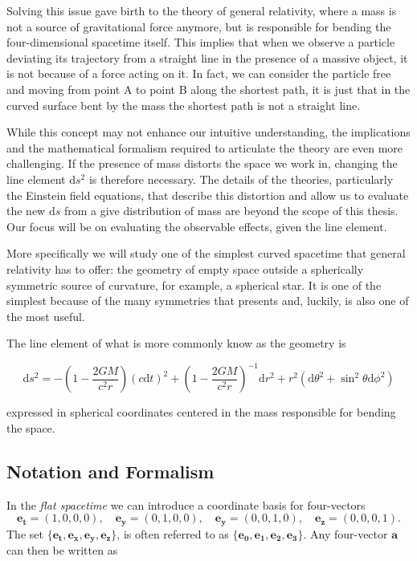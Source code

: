 Solving this issue gave birth to the theory of general relativity, where a mass
is not a source of gravitational force anymore, but is responsible for
bending the four-dimensional spacetime itself.
This implies that when we observe a particle deviating its trajectory from a
straight line in the presence of a massive object, it is not because of a force
acting on it.
In fact, we can consider the particle free and moving from point A to point B
along the shortest path, it is just that in the curved surface bent by the mass
the shortest path is not a straight line.

While this concept may not enhance our intuitive understanding, the
implications and the mathematical formalism required to articulate the theory
are even more challenging.
If the presence of mass distorts the space we work in, changing the line
element $\mathrm{d}s^2$ is therefore necessary.
The details of the theories, particularly the Einstein field equations, that
describe this distortion and allow us to evaluate the new $\mathrm{d}s$ from a
give distribution of mass are beyond the scope of this thesis.
Our focus will be on evaluating the observable effects, given the line
element.

More specifically we will study one of the simplest curved spacetime that
general relativity has to offer: the geometry of empty space outside a
spherically symmetric source of curvature, for example, a spherical
star.
It is one of the simplest because of the many symmetries that presents and,
luckily, is also one of the most useful.

The line element of what is more commonly know as the \Sh geometry is

\begin{equation*}
    \mathrm{d}s^2 = - \left(1 - \frac{2 G M}{c^2 r} \right) (c \mathrm{d}t)^2
    + \left(1 - \frac{2 G M}{c^2 r} \right)^{-1} \mathrm{d}r^2
    + r^2 (\mathrm{d}\theta^2 + \sin^2 \theta \mathrm{d}\phi^2)
\end{equation*}

expressed in spherical coordinates centered in the mass responsible for bending
the space.

\newpage


\subsection{Notation and Formalism} \label{cap1:ssec:notation}

In the \textit{flat spacetime} we can introduce a coordinate basis for
four-vectors
\begin{equation}
    \mathbf{e_t} = (1,0,0,0), \quad
    \mathbf{e_y} = (0,1,0,0), \quad
    \mathbf{e_y} = (0,0,1,0), \quad
    \mathbf{e_z} = (0,0,0,1).
    \label{cap1:eq:coord_base}
\end{equation}
The set 
$\{ \mathbf{e_t}, \mathbf{e_x}, \mathbf{e_y}, \mathbf{e_z} \}$, is often
referred to as $\{ \mathbf{e_0}, \mathbf{e_1}, \mathbf{e_2}, \mathbf{e_3} \}$.
Any four-vector $\textbf{a}$ can then be written as

